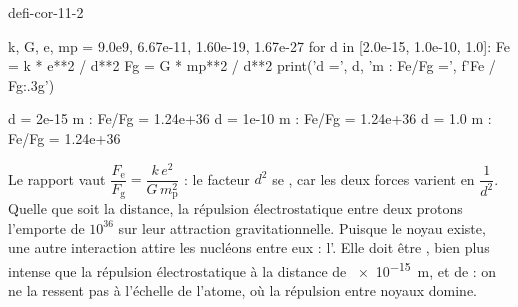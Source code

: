 \begin{blocEdition}{defi-cor-11-2}
\begin{python}
k, G, e, mp = 9.0e9, 6.67e-11, 1.60e-19, 1.67e-27
for d in [2.0e-15, 1.0e-10, 1.0]:
    Fe = k * e**2 / d**2
    Fg = G * mp**2 / d**2
    print('d =', d, 'm : Fe/Fg =', f'{Fe / Fg:.3g}')
\end{python}
\begin{console}
d = 2e-15 m : Fe/Fg = 1.24e+36
d = 1e-10 m : Fe/Fg = 1.24e+36
d = 1.0 m : Fe/Fg = 1.24e+36
\end{console}
Le rapport vaut $\dfrac{F_\mathrm{e}}{F_\mathrm{g}}=\dfrac{k\,e^2}{G\,m_\mathrm{p}^2}$ : le facteur $d^2$ se , car les deux forces varient en $\dfrac{1}{d^2}$. Quelle que soit la
distance, la répulsion électrostatique entre deux protons l'emporte de $10^{36}$ sur leur attraction gravitationnelle.
Puisque le noyau existe, une autre interaction attire les nucléons entre eux : l'. Elle doit être
, bien plus intense que la répulsion électrostatique à la distance de \qty{e-15}{m}, et de  :
on ne la ressent pas à l'échelle de l'atome, où la répulsion entre noyaux domine.
\end{blocEdition}

